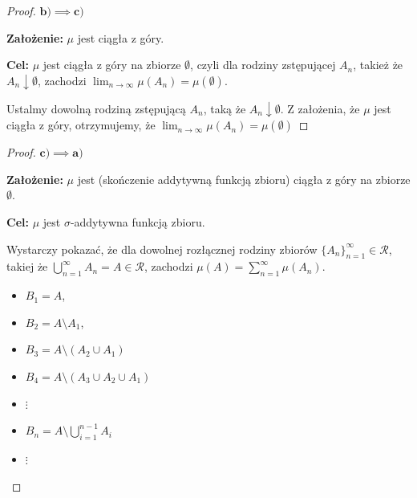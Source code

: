 \begin{proof}
	\noindent $\bm{ b) \implies c) } $ 

	\noindent \textbf{Założenie:} $\mu$ jest ciągła z góry.

	\noindent \textbf{Cel:} $\mu$ jest ciągła z góry na zbiorze $\emptyset $, czyli dla rodziny zstępującej $A_{n}$, takież że $A_{n}\downarrow \emptyset $, zachodzi $\lim_{n \to \infty} \mu\left( A_{n} \right) = \mu\left( \emptyset  \right)$. 

	Ustalmy dowolną rodziną zstępującą  $A_{n}$, taką że $A_{n}\downarrow \emptyset $. Z założenia, że  $\mu$ jest ciągła z góry, otrzymujemy, że $\lim_{n \to \infty} \mu\left( A_{n} \right) = \mu\left( \emptyset  \right) $
\end{proof} 
\begin{proof}
	\noindent $\bm{ c) \implies a) } $ 

	\noindent \textbf{Założenie:} $\mu$ jest (skończenie addytywną funkcją zbioru) ciągła z góry na zbiorze $\emptyset $.

	\noindent \textbf{Cel:} $\mu$ jest $\sigma $-addytywna funkcją zbioru.

	Wystarczy pokazać, że dla dowolnej rozłącznej rodziny zbiorów $\{A_{n}\}_{n=1}^{\infty} \in \mathcal{R}$, takiej że $\bigcup_{n=1}^{\infty}A_{n} = A \in \mathcal{R}$, zachodzi $\mu\left( A \right) = \sum_{n = 1}^{\infty} \mu\left( A_{n} \right) $.
	\begin{itemize}
		\item $B_1 = A$,
		\item $B_2 = A \setminus A_{1}$,
		\item $B_3 = A\setminus \left( A_2 \cup A_1 \right) $
		\item $B_4 = A\setminus \left(A_3 \cup A_2 \cup A_1\right)$
		\item $\vdots$
		\item  $B_{n} = A \setminus \bigcup_{i=1}^{n-1}A_{i}$
		\item $\vdots$
	\end{itemize} 


\end{proof}
